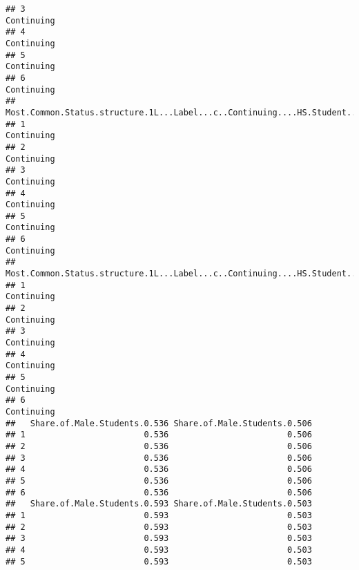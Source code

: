 \documentclass[]{article}
\begin{document}
\begin{verbatim}
## 3                                                                                     Continuing
## 4                                                                                     Continuing
## 5                                                                                     Continuing
## 6                                                                                     Continuing
##   Most.Common.Status.structure.1L...Label...c..Continuing....HS.Student....New....New.No.HS....4
## 1                                                                                     Continuing
## 2                                                                                     Continuing
## 3                                                                                     Continuing
## 4                                                                                     Continuing
## 5                                                                                     Continuing
## 6                                                                                     Continuing
##   Most.Common.Status.structure.1L...Label...c..Continuing....HS.Student....New....New.No.HS....5
## 1                                                                                     Continuing
## 2                                                                                     Continuing
## 3                                                                                     Continuing
## 4                                                                                     Continuing
## 5                                                                                     Continuing
## 6                                                                                     Continuing
##   Share.of.Male.Students.0.536 Share.of.Male.Students.0.506
## 1                        0.536                        0.506
## 2                        0.536                        0.506
## 3                        0.536                        0.506
## 4                        0.536                        0.506
## 5                        0.536                        0.506
## 6                        0.536                        0.506
##   Share.of.Male.Students.0.593 Share.of.Male.Students.0.503
## 1                        0.593                        0.503
## 2                        0.593                        0.503
## 3                        0.593                        0.503
## 4                        0.593                        0.503
## 5                        0.593                        0.503

\end{verbatim}
\end{document}
